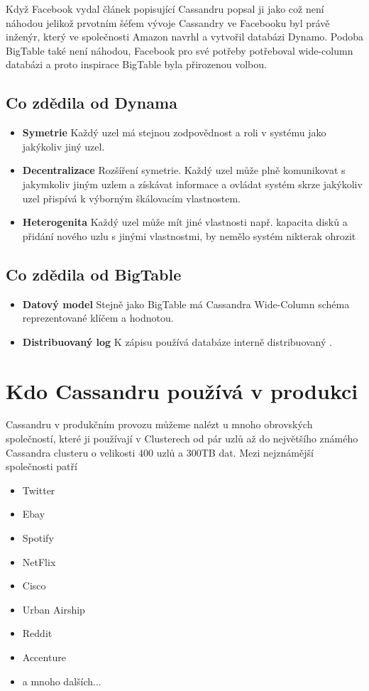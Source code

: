 Když Facebook vydal článek popisující Cassandru \cite{facebookcassandra} popsal ji jako  což není náhodou jelikož prvotním šéfem vývoje Cassandry ve Facebooku byl právě inženýr, který ve společnosti Amazon navrhl a vytvořil databázi Dynamo. Podoba BigTable také není náhodou, Facebook pro své potřeby potřeboval wide-column databázi a proto inspirace BigTable byla přirozenou volbou. 

\subsection{Co zdědila od Dynama}
\begin{itemize}
\item \textbf{Symetrie} Každý uzel má stejnou zodpovědnost a roli v systému jako jakýkoliv jiný uzel.
\item \textbf{Decentralizace} Rozšíření symetrie. Každý uzel může plně komunikovat s jakymkoliv jiným uzlem a získávat informace a ovládat systém skrze jakýkoliv uzel přispívá k výborným škálovacím vlastnostem. 
\item \textbf{Heterogenita} Každý uzel může mít jiné vlastnosti např. kapacita disků a přidání nového uzlu s jinými vlastnostmi, by nemělo systém nikterak ohrozit 
\end{itemize} 

\subsection{Co zdědila od BigTable}
\begin{itemize}
\item \textbf{Datový model} Stejně jako BigTable má Cassandra Wide-Column schéma reprezentované klíčem a hodnotou.
\item \textbf{Distribuovaný log} K zápisu používá databáze interně distribuovaný . 
\end{itemize} 

\section{Kdo Cassandru používá v produkci}

Cassandru v produkčním provozu můžeme nalézt u mnoho obrovských společností, které ji používají v Clusterech od pár uzlů až do největšího známého Cassandra clusteru o velikosti 400 uzlů a 300TB dat. Mezi nejznámější společnosti patří

\begin{itemize}
\item Twitter
\item Ebay
\item Spotify
\item NetFlix
\item Cisco
\item Urban Airship
\item Reddit
\item Accenture
\item a mnoho dalších...
\end{itemize} 

